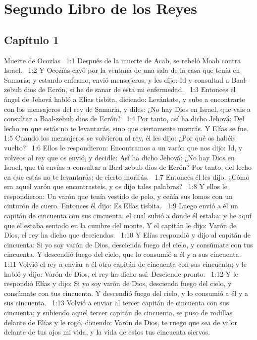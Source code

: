 \chapter{Segundo Libro de los Reyes}
\section*{Capítulo 1 }
Muerte de Ocozías  
1:1 Después de la muerte de Acab, se rebeló Moab contra Israel.  
1:2 Y Ocozías cayó por la ventana de una sala de la casa que tenía en Samaria; y estando enfermo, envió mensajeros, y les dijo: Id y consultad a Baal-zebub dios de Ecrón, si he de sanar de esta mi enfermedad.  
1:3 Entonces el ángel de Jehová habló a Elías tisbita, diciendo: Levántate, y sube a encontrarte con los mensajeros del rey de Samaria, y diles: ¿No hay Dios en Israel, que vais a consultar a Baal-zebub dios de Ecrón?  
1:4 Por tanto, así ha dicho Jehová: Del lecho en que estás no te levantarás, sino que ciertamente morirás. Y Elías se fue.  
1:5 Cuando los mensajeros se volvieron al rey, él les dijo: ¿Por qué os habéis vuelto?  
1:6 Ellos le respondieron: Encontramos a un varón que nos dijo: Id, y volveos al rey que os envió, y decidle: Así ha dicho Jehová: ¿No hay Dios en Israel, que tú envías a consultar a Baal-zebub dios de Ecrón? Por tanto, del lecho en que estás no te levantarás; de cierto morirás.  
1:7 Entonces él les dijo: ¿Cómo era aquel varón que encontrasteis, y os dijo tales palabras?  
1:8 Y ellos le respondieron: Un varón que tenía vestido de pelo, y ceñía sus lomos con un cinturón de cuero. Entonces él dijo: Es Elías tisbita.  
1:9 Luego envió a él un capitán de cincuenta con sus cincuenta, el cual subió a donde él estaba; y he aquí que él estaba sentado en la cumbre del monte. Y el capitán le dijo: Varón de Dios, el rey ha dicho que desciendas.  
1:10 Y Elías respondió y dijo al capitán de cincuenta: Si yo soy varón de Dios, descienda fuego del cielo, y consúmate con tus cincuenta. Y descendió fuego del cielo, que lo consumió a él y a sus cincuenta.  
1:11 Volvió el rey a enviar a él otro capitán de cincuenta con sus cincuenta; y le habló y dijo: Varón de Dios, el rey ha dicho así: Desciende pronto.  
1:12 Y le respondió Elías y dijo: Si yo soy varón de Dios, descienda fuego del cielo, y consúmate con tus cincuenta. Y descendió fuego del cielo, y lo consumió a él y a sus cincuenta.  
1:13 Volvió a enviar al tercer capitán de cincuenta con sus cincuenta; y subiendo aquel tercer capitán de cincuenta, se puso de rodillas delante de Elías y le rogó, diciendo: Varón de Dios, te ruego que sea de valor delante de tus ojos mi vida, y la vida de estos tus cincuenta siervos.  
